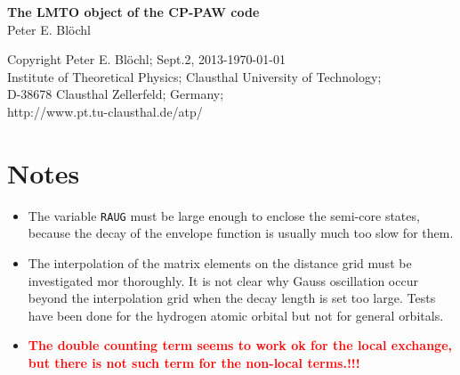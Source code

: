 \documentclass[11pt,a4paper]{report}
\begin{document}
\begin{titlepage}
\begin{center}
\vspace*{3.5cm}
{\huge \textbf{The LMTO object of the CP-PAW code}}\\
\vspace{0.5cm}
{\large Peter E. Bl\"ochl}
\vspace{0.5cm} 
\end{center}

\vfill
\begin{center}
Copyright Peter E. Bl\"ochl; Sept.2, 2013-\today\\
{\small
Institute of Theoretical Physics;
Clausthal University of Technology;\\ 
D-38678 Clausthal Zellerfeld; Germany;\\
http://www.pt.tu-clausthal.de/atp/}
\end{center}
\end{titlepage}
\noindent            
\tableofcontents
\chapter{Notes}
\begin{itemize}
\item The variable \verb|RAUG| must be large enough to enclose the
  semi-core states, because the decay of the envelope function is
  usually much too slow for them. 
%
\item The interpolation of the matrix elements on the distance grid
  must be investigated mor thoroughly. It is not clear why Gauss
  oscillation occur beyond the interpolation grid when the decay
  length is set too large. Tests have been done for the hydrogen
  atomic orbital but not for general orbitals.
%
\item \textcolor{red}{\textbf{The double counting term seems to work
    ok for the local exchange, but there is not such term for the
    non-local terms.!!!}}
\end{itemize}


\end{document}
